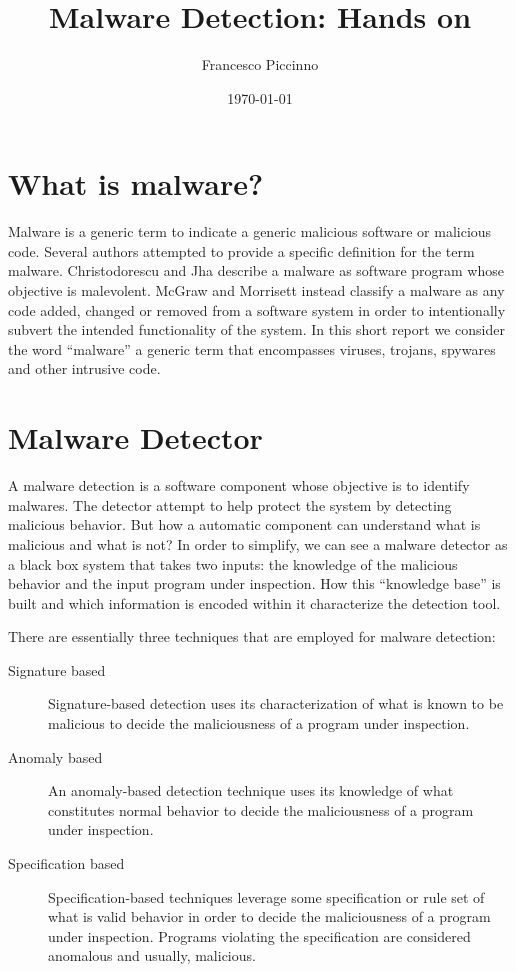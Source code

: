 \documentclass{article}
\title{Malware Detection: Hands on}
\author{Francesco Piccinno}
\date{\today}
\begin{document}
\maketitle

\section{What is malware?}

Malware is a generic term to indicate a generic malicious software or malicious code. Several authors attempted to provide a specific definition for the term malware. Christodorescu and Jha \cite{Christodorescu} describe a malware as software program whose objective is malevolent. McGraw and Morrisett \cite{mcf} instead classify a malware as any code added, changed or removed from a software system in order to intentionally subvert the intended functionality of the system. In this short report we consider the word ``malware'' a generic term that encompasses viruses, trojans, spywares and other intrusive code.

\section{Malware Detector}

A malware detection is a software component whose objective is to identify malwares. The detector attempt to help protect the system by detecting malicious behavior. But how a automatic component can understand what is malicious and what is not? In order to simplify, we can see a malware detector as a black box system that takes two inputs: the knowledge of the malicious behavior and the input program under inspection. How this ``knowledge base'' is built and which information is encoded within it characterize the detection tool.

There are essentially three techniques that are employed for malware detection:

\begin{description}
  \item[Signature based] Signature-based detection uses its characterization of what is known to be malicious to decide the maliciousness of a program under inspection.
  \item[Anomaly based] An anomaly-based detection technique uses its knowledge of what constitutes normal behavior to decide the maliciousness of a program under inspection.
  \item[Specification based] Specification-based techniques leverage some specification or rule set of what is valid behavior in order to decide the maliciousness of a program under inspection. Programs violating the specification are considered anomalous and usually, malicious.
\end{description}
\end{document}
